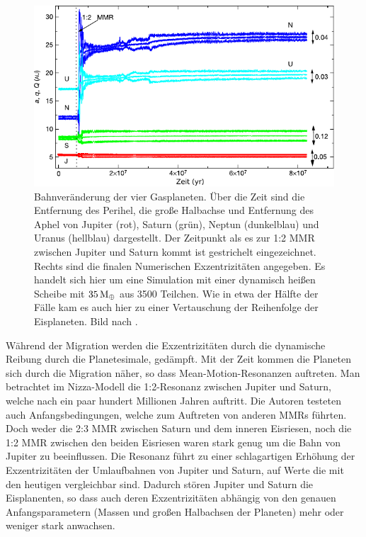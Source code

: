 \documentclass[12pt,a4paper,twoside]{article}
\renewcommand{\cite}{\citep}
\newcommand{\ME}{M_\oplus}
\begin{document}
\begin{figure}[tbn]
\centering
\includegraphics[scale=1]{img/Tsiganis2005-1.pdf}
\caption{Bahnveränderung der vier Gasplaneten. Über die Zeit sind die Entfernung des Perihel, die große Halbachse und Entfernung des Aphel von Jupiter (rot), Saturn (grün), Neptun (dunkelblau) und Uranus (hellblau) dargestellt. Der Zeitpunkt als es zur 1:2 MMR zwischen Jupiter und Saturn kommt ist gestrichelt eingezeichnet. Rechts sind die finalen Numerischen Exzentrizitäten angegeben. Es handelt sich hier um eine Simulation mit einer dynamisch heißen Scheibe mit $\unit[35]{\ME}$ aus 3500 Teilchen. Wie in etwa der Hälfte der Fälle kam es auch hier zu einer Vertauschung der Reihenfolge der Eisplaneten. Bild nach \cite{Tsiganis2005}.}
\label{fig:Orbitalevolution}
\end{figure}
Während der Migration werden die Exzentrizitäten durch die dynamische Reibung durch die Planetesimale, gedämpft\cite{Tsiganis2005}.
Mit der Zeit kommen die Planeten sich durch die Migration näher, so dass Mean-Motion-Resonanzen auftreten.
Man betrachtet im Nizza-Modell die 1:2-Resonanz zwischen Jupiter und Saturn, welche nach ein paar hundert Millionen Jahren auftritt.
Die Autoren testeten auch Anfangsbedingungen, welche zum Auftreten von anderen MMRs führten. Doch weder die 2:3 MMR zwischen Saturn und dem inneren Eisriesen, noch die 1:2 MMR zwischen den beiden Eisriesen waren stark genug um die Bahn von Jupiter zu beeinflussen\cite{Tsiganis2005}.
Die Resonanz führt zu einer schlagartigen Erhöhung der Exzentrizitäten der Umlaufbahnen von Jupiter und Saturn, auf Werte die mit den heutigen vergleichbar sind.
Dadurch stören Jupiter und Saturn die Eisplanenten, so dass auch deren Exzentrizitäten abhängig von den genauen Anfangsparametern (Massen und großen Halbachsen der Planeten) mehr oder weniger stark anwachsen\cite{Tsiganis2005}.
\end{document}
